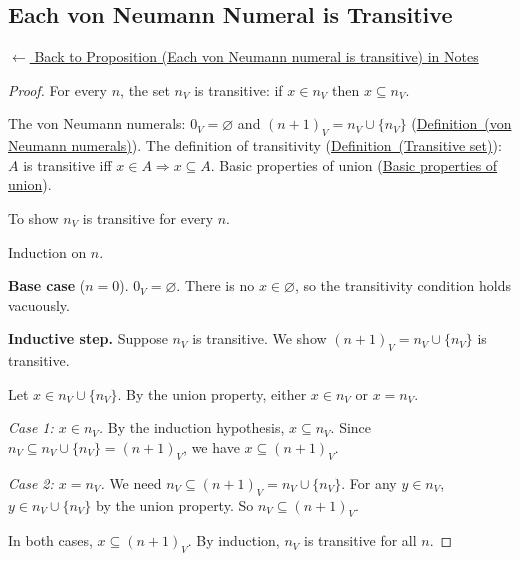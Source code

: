
\subsection*{Each von Neumann Numeral is Transitive}
\label{prf:vn-transitive}

\begin{remark*}[Return]
\hyperref[prop:vn-transitive]{$\leftarrow$ Back to Proposition (Each von Neumann numeral is transitive) in Notes}
\end{remark*}

\begin{proof}
\Claim For every $n$, the set $n_V$ is transitive: if $x \in n_V$ then $x \subseteq n_V$.

\Given The von Neumann numerals: $0_V = \varnothing$ and $(n+1)_V = n_V \cup
\{n_V\}$ (\hyperref[def:vn-numerals]{Definition~(von Neumann numerals)}).
The definition of transitivity (\hyperref[def:transitive-set]{Definition~(Transitive set)}):
$A$ is transitive iff $x \in A \Rightarrow x \subseteq A$.
Basic properties of union (\hyperref[prop:union-basics]{Basic properties of union}).

\Goal To show $n_V$ is transitive for every $n$.

\Strategy Induction on $n$.

\medskip
\noindent\textbf{Base case} ($n = 0$). $0_V = \varnothing$. There is no $x
\in \varnothing$, so the transitivity condition holds vacuously. \checkbox

\medskip
\noindent\textbf{Inductive step.} Suppose $n_V$ is transitive. We show
$(n+1)_V = n_V \cup \{n_V\}$ is transitive.

Let $x \in n_V \cup \{n_V\}$. By the union property, either $x \in n_V$ or $x
= n_V$.

\textit{Case 1: $x \in n_V$.} By the induction hypothesis, $x \subseteq n_V$.
Since $n_V \subseteq n_V \cup \{n_V\} = (n+1)_V$, we have $x \subseteq
(n+1)_V$.

\textit{Case 2: $x = n_V$.} We need $n_V \subseteq (n+1)_V = n_V \cup \{n_V\}$.
For any $y \in n_V$, $y \in n_V \cup \{n_V\}$ by the union property. So $n_V
\subseteq (n+1)_V$. \checkbox

In both cases, $x \subseteq (n+1)_V$. By induction, $n_V$ is transitive for
all $n$. \AsReq
\end{proof}

